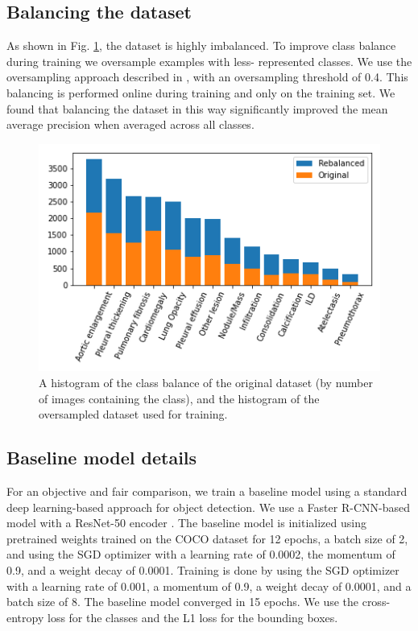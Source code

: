 \documentclass[conference]{IEEEtran}
\begin{document}
\subsection{Balancing the dataset}

As shown in Fig. \ref{fig:class-balance}, the dataset is highly imbalanced. To improve class balance during training we oversample examples with less-
represented classes. We use the oversampling approach described in \cite{gupta2019lvis}, with an oversampling threshold of 0.4. This balancing is performed 
online during training and only on the training set. We found that balancing the dataset in this way significantly improved the mean average precision when 
averaged across all classes.

\begin{figure}[t]
\centering
\includegraphics[width=\columnwidth]{images/rebalace}
\caption{A histogram of the class balance of the original dataset (by number of images containing the class), and the histogram of the oversampled dataset used for training.}
\label{fig:class-balance}
\end{figure}

\subsection{Baseline model details}

For an objective and fair comparison, we train a baseline model using a standard 
deep learning-based approach for object detection. We use a Faster R-CNN-based 
model \cite{DBLP:conf/nips/RenHGS15} with a ResNet-50 encoder \cite{He_2016_CVPR}. 
The baseline model is initialized using pretrained weights trained on the COCO dataset for 
12 epochs, a batch size of 2, and using the SGD optimizer with a learning rate of 
0.0002, the momentum of 0.9, and a weight decay of 0.0001. Training
is done by using the SGD optimizer with a learning rate of 0.001, a momentum of 0.9, a weight decay 
of 0.0001, and a batch size of 8. The baseline model converged in 15 epochs. We use the cross-entropy loss
for the classes and the L1 loss for the bounding boxes.
\end{document}
